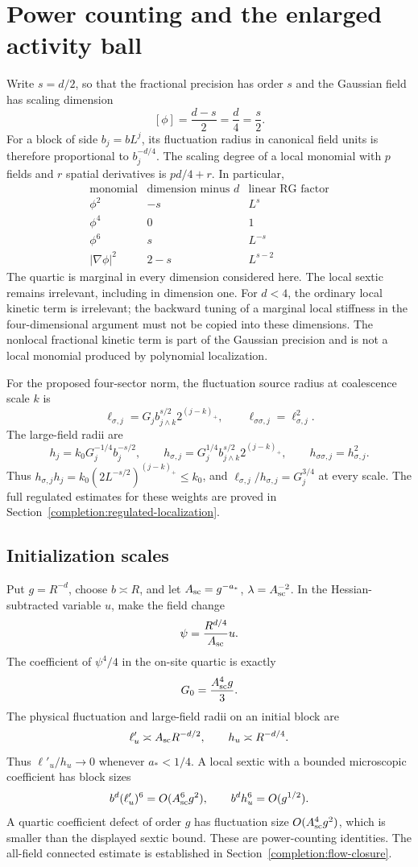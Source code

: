 \documentclass[11pt]{article}
\begin{document}
\section{Power counting and the enlarged activity ball}
\label{frac:scaling}
Write \(s=d/2\), so that the fractional precision has order \(s\)
and the Gaussian field has scaling dimension
\[
 [\phi]=\frac{d-s}{2}=\frac d4=\frac s2.
\]
For a block of side \(b_j=bL^j\), its fluctuation radius in
canonical field units is therefore proportional to \(b_j^{-d/4}\).
The scaling degree of a local monomial with \(p\) fields and
\(r\) spatial derivatives is \(p d/4+r\). In particular,
\[
 \begin{array}{c|c|c}
 \text{monomial}&\text{dimension minus }d&\text{linear RG factor}\\ \hline
 \phi^2&-s&L^s\\
 \phi^4&0&1\\
 \phi^6&s&L^{-s}\\
 |\nabla\phi|^2&2-s&L^{s-2}
 \end{array}
\]
The quartic is marginal in every dimension considered here. The local
sextic remains irrelevant, including in dimension one. For \(d<4\),
the ordinary local kinetic term is irrelevant; the backward tuning
of a marginal local stiffness in the four-dimensional argument must
not be copied into these dimensions. The nonlocal fractional kinetic
term is part of the Gaussian precision and is not a local monomial
produced by polynomial localization.

For the proposed four-sector norm, the fluctuation source radius
at coalescence scale \(k\) is
\[
 \ell_{\sigma,j}=G_j b_{j\wedge k}^{s/2}2^{(j-k)_+},
 \qquad \ell_{\sigma\sigma,j}=\ell_{\sigma,j}^2.
\]
The large-field radii are
\[
 h_j=k_0G_j^{-1/4}b_j^{-s/2},\qquad
 h_{\sigma,j}=G_j^{1/4}b_{j\wedge k}^{s/2}2^{(j-k)_+},\qquad
 h_{\sigma\sigma,j}=h_{\sigma,j}^2.
\]
Thus \(h_{\sigma,j}h_j=k_0(2L^{-s/2})^{(j-k)_+}\le k_0\), and
\(\ell_{\sigma,j}/h_{\sigma,j}=G_j^{3/4}\) at every scale.
The full regulated estimates for these weights are proved in
Section~\ref{completion:regulated-localization}.

\subsection{Initialization scales}
Put \(g=R^{-d}\), choose \(b\asymp R\), and let
\(A_{\rm sc}=g^{-a_*}\), \(\lambda=A_{\rm sc}^{-2}\).
In the Hessian-subtracted variable \(u\), make the field change
\[
 \psi=\frac{R^{d/4}}{A_{\rm sc}}u.
\]
The coefficient of \(\psi^4/4\) in the on-site quartic is exactly
\[
 G_0=\frac{A_{\rm sc}^4g}{3}.
\]
The physical fluctuation and large-field radii on an initial block are
\[
 \ell'_u\asymp A_{\rm sc}R^{-d/2},\qquad
 h_u\asymp R^{-d/4}.
\]
Thus \(\ell'_u/h_u\to0\) whenever \(a_*<1/4\). A local sextic
with a bounded microscopic coefficient has block sizes
\[
 b^d(\ell'_u)^6=O(A_{\rm sc}^6g^2),\qquad
 b^d h_u^6=O(g^{1/2}).
\]
A quartic coefficient defect of order \(g\) has fluctuation size
\(O(A_{\rm sc}^4g^2)\), which is smaller than the displayed
sextic bound. These are power-counting identities. The all-field connected estimate is established in Section~\ref{completion:flow-closure}.
\end{document}
